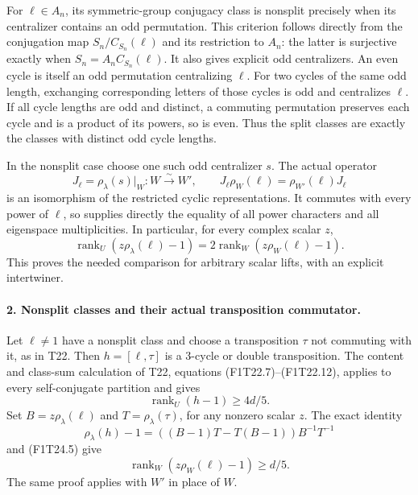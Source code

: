 For \(\ell\in A_n\), its symmetric-group
conjugacy class is nonsplit precisely when its
centralizer contains an odd permutation. This
criterion follows directly from the conjugation
map \(S_n/C_{S_n}(\ell)\) and its restriction
to \(A_n\): the latter is surjective exactly
when \(S_n=A_n C_{S_n}(\ell)\).
It also gives explicit odd centralizers. An even
cycle is itself an odd permutation centralizing
\(\ell\). For two cycles of the same odd
length, exchanging corresponding letters of those
cycles is odd and centralizes \(\ell\). If all
cycle lengths are odd and distinct, a commuting
permutation preserves each cycle and is a product
of its powers, so is even. Thus the split classes
are exactly the classes with distinct odd cycle
lengths.

In the nonsplit case choose one such odd
centralizer \(s\). The actual operator
\[
 J_\ell=\rho_\lambda(s)|_W:W\xrightarrow{\sim}W',
 \qquad
 J_\ell\rho_W(\ell)=\rho_{W'}(\ell)J_\ell
 \tag{F1T24.4}
\]
is an isomorphism of the restricted cyclic
representations. It commutes with every power of
\(\ell\), so supplies directly the equality of
all power characters and all eigenspace
multiplicities. In particular, for every complex
scalar \(z\),
\[
 \operatorname{rank}_U(z\rho_\lambda(\ell)-1)
       =2\operatorname{rank}_W(z\rho_W(\ell)-1).
 \tag{F1T24.5}
\]
This proves the needed comparison for arbitrary
scalar lifts, with an explicit intertwiner.

\paragraph{2. Nonsplit classes and their actual transposition commutator.}
Let \(\ell\ne1\) have a nonsplit class and
choose a transposition \(\tau\) not commuting
with it, as in T22. Then
\(h=[\ell,\tau]\) is a 3-cycle or double
transposition. The content and class-sum calculation
of T22, equations (F1T22.7)--(F1T22.12), applies
to every self-conjugate partition and gives
\[
             \operatorname{rank}_U(h-1)\ge4d/5.
 \tag{F1T24.6}
\]
Set \(B=z\rho_\lambda(\ell)\) and
\(T=\rho_\lambda(\tau)\), for any nonzero
scalar \(z\). The exact identity
\[
 \rho_\lambda(h)-1
       =((B-1)T-T(B-1))B^{-1}T^{-1}
 \tag{F1T24.7}
\]
and (F1T24.5) give
\[
 \operatorname{rank}_W(z\rho_W(\ell)-1)\ge d/5.
 \tag{F1T24.8}
\]
The same proof applies with \(W'\) in place of
\(W\).

